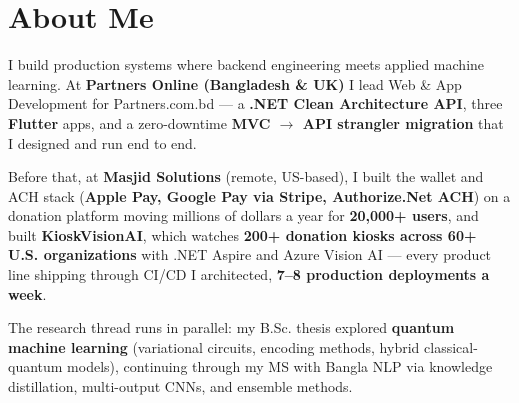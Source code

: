 \section{About Me}
\small{
I build production systems where backend engineering meets applied machine learning.
At \textbf{Partners Online (Bangladesh \& UK)} I lead Web \& App Development for Partners.com.bd —
a \textbf{.NET Clean Architecture API}, three \textbf{Flutter} apps, and a zero-downtime
\textbf{MVC $\rightarrow$ API strangler migration} that I designed and run end to end.

Before that, at \textbf{Masjid Solutions} (remote, US-based), I built the wallet and ACH stack
(\textbf{Apple Pay, Google Pay via Stripe, Authorize.Net ACH}) on a donation platform moving
millions of dollars a year for \textbf{20,000+ users}, and built \textbf{KioskVisionAI}, which
watches \textbf{200+ donation kiosks across 60+ U.S. organizations} with .NET Aspire and Azure
Vision AI — every product line shipping through CI/CD I architected, \textbf{7--8 production
deployments a week}.

The research thread runs in parallel: my B.Sc. thesis explored \textbf{quantum machine learning}
(variational circuits, encoding methods, hybrid classical-quantum models), continuing through
my MS with Bangla NLP via knowledge distillation, multi-output CNNs, and ensemble methods.
}
